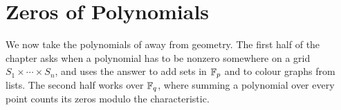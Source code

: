\chapter{Zeros of Polynomials} \label{Ch8:CH}
\thispagestyle{empty}

We now take the polynomials of  away from geometry. The first half of the chapter asks when a polynomial has to be nonzero somewhere on a grid $S_1 \times \cdots \times S_n$, and uses the answer to add sets in $\mathbb{F}_p$ and to colour graphs from lists. The second half works over $\mathbb{F}_q$, where summing a polynomial over every point counts its zeros modulo the characteristic.



